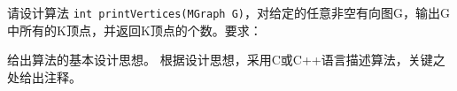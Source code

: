 \begin{qitems}
\begin{bbox}
            请设计算法 \lstinline{int printVertices(MGraph G)}，对给定的任意非空有向图G，输出G中所有的K顶点，并返回K顶点的个数。要求：
            \begin{subqitems}
                \subqitem 给出算法的基本设计思想。
                \subqitem 根据设计思想，采用C或C++语言描述算法，关键之处给出注释。
            \end{subqitems}
    \end{bbox}
    
\end{qitems} 